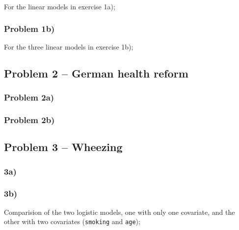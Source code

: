 \documentclass[a4paper,11pt]{article}
\begin{document}
For the linear models in exercise 1a);
{\footnotesize
    
}

\subsubsection{Problem 1b)}
\label{app:1b}

For the three linear models in exercise 1b);
{\footnotesize
    
}

\subsection{Problem 2 -- German health reform}

\subsubsection{Problem 2a)}
\label{app:2a}
{\footnotesize
    
}

\subsubsection{Problem 2b)}
\label{app:2b}
{\footnotesize
    
}

\subsection{Problem 3 -- Wheezing}
\subsubsection{3a)}
{\footnotesize
    
}


\subsubsection{3b)}
{\footnotesize
    
}

Comparision of the two logistic models, one with only one covariate, and the other with two covariates (\texttt{smoking} and \texttt{age});
{\footnotesize
    
}



%
\end{document}
